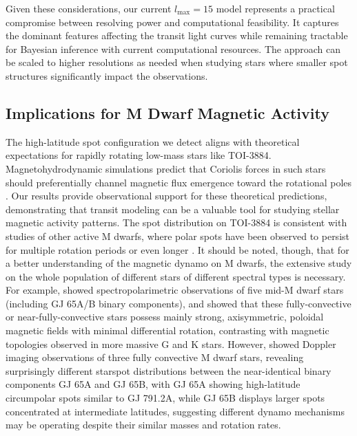 \documentclass[twocolumn]{aastex631}
\begin{document}
Given these considerations, our current $l_{\text{max}}=15$ model represents a practical compromise between resolving 
power and computational feasibility. It captures the dominant features affecting the transit light curves while remaining 
tractable for Bayesian inference with current computational resources. The approach can be scaled to higher resolutions as 
needed when studying stars where smaller spot structures significantly impact the observations.

\subsection{Implications for M Dwarf Magnetic Activity}

The high-latitude spot configuration we detect aligns with theoretical expectations for rapidly rotating low-mass stars like 
TOI-3884. Magnetohydrodynamic simulations predict that Coriolis forces in such stars should preferentially channel 
magnetic flux emergence toward the rotational poles \citep{Yadav2015,Almenara2022}. Our results provide observational support for these theoretical predictions, 
demonstrating that transit modeling can be a valuable tool for studying stellar magnetic activity patterns.
The spot distribution on TOI-3884 is consistent with studies of other active M dwarfs, where polar spots have been observed 
to persist for multiple rotation periods or even longer \citep{Barnes2017,Morin2008,Strassmeier2009}. It should be noted, though,
that for a better understanding of the magnetic dynamo on M dwarfs, the extensive study on the whole population of different
stars of different spectral types is necessary. 
For example, \cite{Morin2008} showed spectropolarimetric observations of five mid-M dwarf stars 
(including GJ 65A/B binary components), and showed that these fully-convective or near-fully-convective stars possess 
mainly strong, axisymmetric, poloidal magnetic fields with minimal differential rotation, contrasting with magnetic 
topologies observed in more massive G and K stars. However,
\cite{Barnes2017} showed Doppler imaging observations of three fully convective M dwarf stars, revealing surprisingly 
different starspot distributions between the near-identical binary components GJ 65A and GJ 65B, with GJ 65A showing 
high-latitude circumpolar spots similar to GJ 791.2A, while GJ 65B displays larger spots concentrated at intermediate 
latitudes, suggesting different dynamo mechanisms may be operating despite their similar masses and rotation rates.
\end{document}
